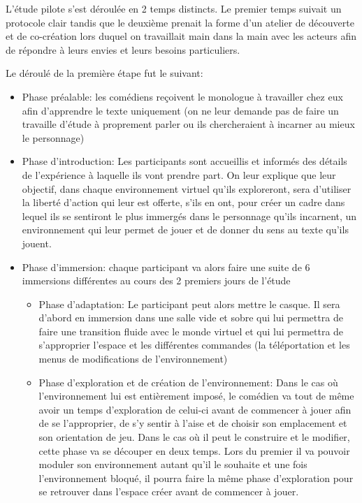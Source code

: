 L'étude pilote s'est déroulée en 2 temps distincts. Le premier temps suivait un protocole clair tandis que le deuxième prenait la forme d'un atelier de découverte et de co-création
lors duquel on travaillait main dans la main avec les acteurs afin de répondre à leurs envies et leurs besoins particuliers. 

Le déroulé de la première étape fut le suivant: 
\begin{itemize}
    \item Phase préalable: les comédiens reçoivent le monologue à travailler chez eux afin d'apprendre le texte uniquement (on ne leur demande pas de faire un travaille d'étude à proprement parler ou ils chercheraient à incarner au mieux le personnage)
    \item Phase d'introduction:  Les participants sont accueillis et informés des détails de l'expérience à laquelle ils vont prendre part. On leur explique que leur objectif, dans chaque environnement virtuel qu’ils exploreront, sera d’utiliser la liberté d’action qui leur est offerte, s’ils en ont, pour créer un cadre dans lequel ils se sentiront le plus immergés dans le personnage qu’ils incarnent, un environnement qui leur permet de jouer et de donner du sens au texte qu'ils jouent. 
    \item Phase d'immersion: chaque participant va alors faire une suite de 6 immersions différentes au cours des 2 premiers jours de l'étude
    \begin{itemize}
    \item Phase d'adaptation: Le participant peut alors mettre le casque. Il sera d'abord en immersion dans une salle vide et sobre qui lui permettra de faire une transition fluide avec le monde virtuel et qui lui permettra de s'approprier l'espace et les différentes commandes (la téléportation et les menus de modifications de l'environnement)
    \item Phase d'exploration et de création de l'environnement: Dans le cas où l'environnement lui est entièrement imposé, le comédien va tout de même avoir un temps d'exploration de celui-ci avant de commencer à jouer afin de se l'approprier, de s'y sentir à l'aise et de choisir son emplacement et son orientation de jeu. Dans le cas où il peut le construire et le modifier, cette phase va se découper en deux temps. Lors du premier il va pouvoir moduler son environnement autant qu'il le souhaite et une fois l'environnement bloqué, il pourra faire la même phase d'exploration pour se retrouver dans l'espace créer avant de commencer à jouer.
    

\end{itemize}
\end{itemize}
